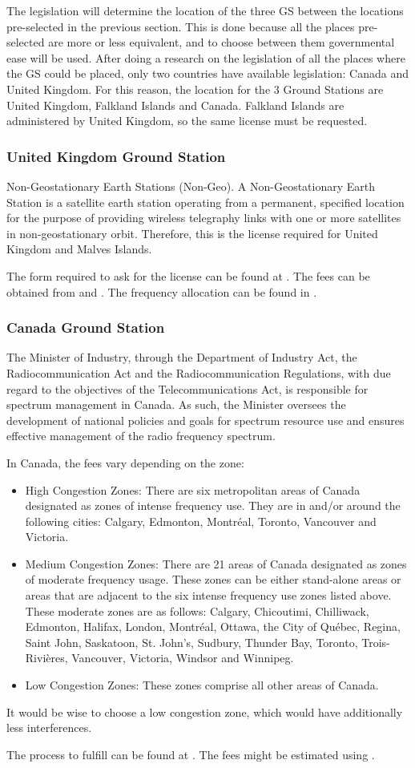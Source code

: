 The legislation will determine the location of the three GS between the locations pre-selected in the previous section. This is done because all the places pre-selected are more or less equivalent, and to choose between them governmental ease will be used. After doing a research on the legislation of all the places where the GS could be placed, only two countries have available legislation: Canada and United Kingdom. For this reason, the location for the 3 Ground Stations are United Kingdom, Falkland Islands and Canada. Falkland Islands are administered by United Kingdom, so the same license must be requested.

\subsubsection{United Kingdom Ground Station}
Non-Geostationary Earth Stations (Non-Geo). A Non-Geostationary Earth Station is a satellite earth station operating from a permanent, specified location for the purpose of providing wireless telegraphy links with one or more satellites in non-geostationary orbit. Therefore, this is the license required for United Kingdom and Malves Islands.

The form required to ask for the license can be found at \cite{UKForm}. The fees can be obtained from \cite{UKFees} and \cite{UKMHzFees}. The frequency allocation can be found in \cite{UKAllocation}.

\subsubsection{Canada Ground Station}
The Minister of Industry, through the Department of Industry Act, the Radiocommunication Act and the Radiocommunication Regulations, with due regard to the objectives of the Telecommunications Act, is responsible for spectrum management in Canada. As such, the Minister oversees the development of national policies and goals for spectrum resource use and ensures effective management of the radio frequency spectrum.

In Canada, the fees vary depending on the zone:
\begin{itemize}
\item High Congestion Zones: There are six metropolitan areas of Canada designated as zones of intense frequency use. They are in and/or around the following cities: Calgary, Edmonton, Montréal, Toronto, Vancouver and Victoria.
\item Medium Congestion Zones: There are 21 areas of Canada designated as zones of moderate frequency usage. These zones can be either stand-alone areas or areas that are adjacent to the six intense frequency use zones listed above. These moderate zones are as follows: Calgary, Chicoutimi, Chilliwack, Edmonton, Halifax, London, Montréal, Ottawa, the City of Québec, Regina, Saint John, Saskatoon, St. John's, Sudbury, Thunder Bay, Toronto, Trois-Rivières, Vancouver, Victoria, Windsor and Winnipeg.
\item Low Congestion Zones: These zones comprise all other areas of Canada.
\end{itemize}

It would be wise to choose a low congestion zone, which would have additionally less interferences. 

The process to fulfill can be found at \cite{CndForm}. The fees might be estimated using \cite{CndFees}.